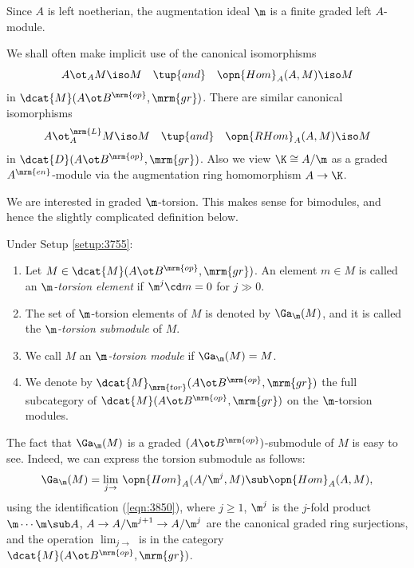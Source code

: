 Since $A$ is left noetherian, the augmentation ideal $\m$ is a
finite graded left $A$-module. 

We shall often make implicit use of the canonical isomorphisms 
\begin{equation} \label{eqn:3850}
A \ot_{A} M \iso M \quad \tup{and} \quad \opn{Hom}_A(A, M) \iso M
\end{equation}
in $\dcat{M}(A \ot B^{\mrm{op}}, \mrm{gr})$. There are similar canonical 
isomorphisms
\begin{equation} \label{eqn:3790}
A \ot^{\mrm{L}}_{A} M \iso M \quad \tup{and} \quad \opn{RHom}_A(A, M) \iso M
\end{equation}
in $\dcat{D}(A \ot B^{\mrm{op}}, \mrm{gr})$. Also we view
$\K \cong A / \m$ as a graded $A^{\mrm{en}}$-module via the augmentation ring 
homomorphism $A \to \K$. 

We are interested in graded $\m$-torsion. This makes sense for bimodules, and 
hence the slightly complicated definition below. 

\begin{dfn} \label{dfn:3745}
Under Setup \ref{setup:3755}:
\begin{enumerate}
\item Let $M \in \dcat{M}(A \ot B^{\mrm{op}}, \mrm{gr})$. 
An element $m \in M$ is called an {\em $\m$-torsion element} 
if $\m^j \cd m = 0$ for $j \gg 0$. 

\item The set of $\m$-torsion elements of $M$ is denoted by 
$\Ga_{\m}(M)$, 
and it is called the {\em $\m$-torsion submodule} of $M$.

\item We call $M$ an {\em $\m$-torsion module} 
if $\Ga_{\m}(M) = M$.

\item We denote by 
$\dcat{M}_{\mrm{tor}}(A \ot B^{\mrm{op}}, \mrm{gr})$
the full subcategory of 
$\dcat{M}(A \ot B^{\mrm{op}}, \mrm{gr})$
on the $\m$-torsion modules. 
\end{enumerate}
\end{dfn}

The fact that $\Ga_{\m}(M)$ is a graded $(A \ot B^{\mrm{op}})$-submodule of $M$ 
is easy to see. Indeed, we can express the torsion submodule as follows: 
\begin{equation} \label{eqn:3772}
\Ga_{\m}(M) = \lim_{j \to} \, 
\opn{Hom}_A( A / \m^{j}, M) \sub \opn{Hom}_A(A, M) , 
\end{equation}
using the identification (\ref{eqn:3850}), 
where $j \geq 1$, $\m^j$ is the $j$-fold product 
$\m \cdots \m \sub A$, 
$A \to A / \m^{j + 1} \to A / \m^{j}$ are the canonical graded ring 
surjections, and the operation $\lim_{j \to}$ is in the category 
$\dcat{M}(A \ot B^{\mrm{op}}, \mrm{gr})$. 

